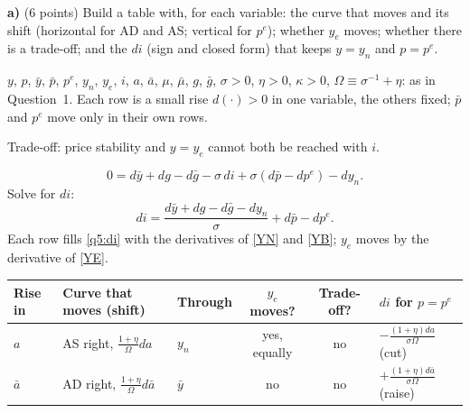 

\textbf{a)} (6 points) Build a table with, for each variable: the curve that moves and its shift (horizontal for AD and AS; vertical for
$p^e$); whether $y_e$ moves; whether there is a trade-off; and the $di$ (sign and closed form) that keeps $y=y_n$ and $p=p^e$.
\resolespaco
\begin{sol}
\begin{notacao}
\item $y$, $p$, $\bar y$, $\bar p$, $p^e$, $y_n$, $y_e$, $i$, $a$, $\bar a$, $\mu$, $\bar\mu$, $g$, $\bar g$, $\sigma>0$, $\eta>0$, $\kappa>0$, $\Omega\equiv\sigma^{-1}+\eta$: as in
Question~1. Each row is a small rise $d(\cdot)>0$ in one variable, the others fixed; $\bar p$ and $p^e$ move only in their own rows.
\item Trade-off: price stability and $y=y_e$ cannot both be reached with $i$.
\end{notacao}
\begin{equation}
0=d\bar y+dg-d\bar g-\sigma\,di+\sigma(d\bar p-dp^e)-dy_n . \nonumber
\end{equation}
Solve for $di$:
\begin{equation}
di=\frac{d\bar y+dg-d\bar g-dy_n}{\sigma}+d\bar p-dp^e . \label{q5:di}
\end{equation}
Each row fills \eqref{q5:di} with the derivatives of \eqref{YN} and \eqref{YB}; $y_e$ moves by the derivative of \eqref{YE}.
\begin{center}\small
\begin{tabular}{lllccl}
\toprule
Rise in & Curve that moves (shift) & Through & $y_e$ moves? & Trade-off? & $di$ for $p=p^e$ \\
\midrule
$a$ & AS right, $\frac{1+\eta}{\Omega}da$ & $y_n$ & yes, equally & no & $-\frac{(1+\eta)da}{\sigma\Omega}$ (cut) \\
$\bar a$ & AD right, $\frac{1+\eta}{\Omega}d\bar a$ & $\bar y$ & no & no & $+\frac{(1+\eta)d\bar a}{\sigma\Omega}$ (raise) \\

\end{tabular}
\end{center}
\end{sol}
